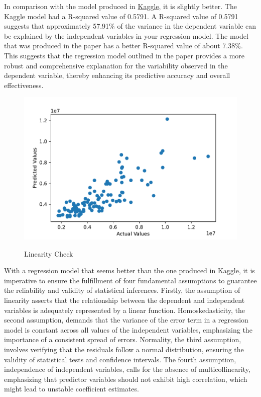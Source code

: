 \documentclass[12pt]{article}
\begin{document}
In comparison with the model produced in \href{https://www.kaggle.com/code/ashydv/housing-price-prediction-linear-regression/notebook}{Kaggle}, it is slightly better. The Kaggle model had a R-squared value of 0.5791. A R-squared value of 0.5791 suggests that approximately 57.91\% of the variance in the dependent variable can be explained by the independent variables in your regression model. The model that was produced in the paper has a better R-squared value of about 7.38\%. This suggests that the regression model outlined in the paper provides a more robust and comprehensive explanation for the variability observed in the dependent variable, thereby enhancing its predictive accuracy and overall effectiveness.

\begin{figure}[t]
    \caption{Linearity Check}
    \includegraphics[width=1\textwidth]{linearity_check.pdf}
    \label{fig:linearity_check}

\end{figure}

With a regression model that seems better than the one produced in Kaggle, it is imperative to ensure the fulfillment of four fundamental assumptions to guarantee the reliability and validity of statistical inferences. Firstly, the assumption of linearity asserts that the relationship between the dependent and independent variables is adequately represented by a linear function. Homoskedasticity, the second assumption, demands that the variance of the error term in a regression model is constant across all values of the independent variables, emphasizing the importance of a consistent spread of errors. Normality, the third assumption, involves verifying that the residuals follow a normal distribution, ensuring the validity of statistical tests and confidence intervals. The fourth assumption, independence of independent variables, calls for the absence of multicollinearity, emphasizing that predictor variables should not exhibit high correlation, which might lead to unstable coefficient estimates.\cite{CFA}
\end{document}
